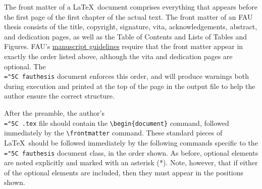\documentclass[11pt]{article}
\newcommand\guide{{http://www.fau.edu/graduate/forms-and-procedures/degree-completion/thesis-and-dissertation/index.php}}
\newcommand\code[1]{{\normalfont\texttt{\let\dv\textsl\chardef\\="5C #1}}}
\begin{document}
The front matter of a \LaTeX\ document comprises everything that appears before the first page of the first chapter of the actual text.  The front matter of an FAU thesis consists of the title, copyright, signature, vita, acknowledgements, abstract, and dedication pages, as well as the Table of Contents and Lists of Tables and Figures.  FAU's 
\href\guide{manuscript guidelines} 
require that the front matter appear in exactly the order listed above, although the vita and dedication pages are optional.  The \code{fauthesis} document enforces this order, and will produce warnings both during execution and printed at the top of the page in the output file to help the author ensure the correct structure.

After the preamble, the author's \code{.tex} file should contain the \verb=\begin{document}= command, followed immediately by the \verb=\frontmatter= command.  These standard pieces of \LaTeX\ should be followed immediately by the following commands specific to the \code{fauthesis} document class, in the order shown.  As before, optional elements are noted explicitly and marked with an asterisk (*).  Note, however, that if either of the optional elements are included, then they must appear in the positions shown.
%
\end{document}
